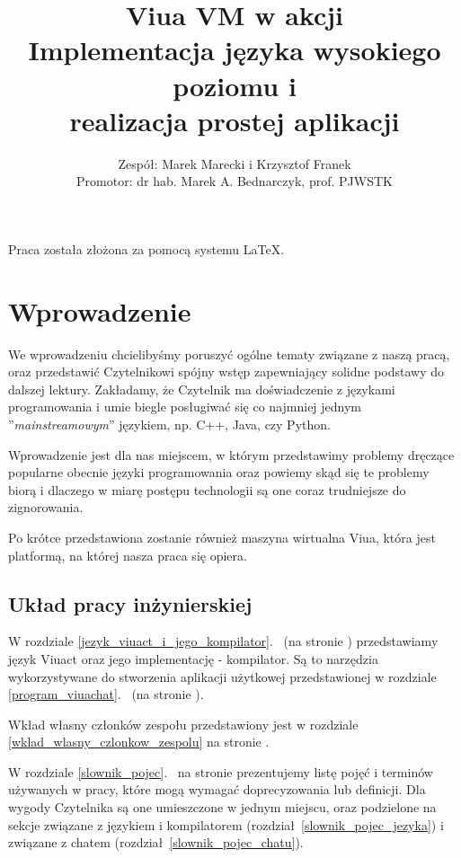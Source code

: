 \documentclass[11pt,oneside,a4paper,titlepage,onecolumn]{book}
\author{Zespół: Marek Marecki i Krzysztof Franek\\Promotor: dr hab. Marek A. Bednarczyk, prof. PJWSTK}
\title{%
    Viua VM w akcji \\
    \large
    Implementacja języka wysokiego poziomu i \\
    realizacja prostej aplikacji}
\begin{document}

\maketitle

\tableofcontents
\listoffigures

Praca została złożona za pomocą systemu \LaTeX.

\newpage

\chapter{Wprowadzenie}

We wprowadzeniu chcielibyśmy poruszyć ogólne tematy związane z naszą pracą, oraz przedstawić Czytelnikowi
spójny wstęp zapewniający solidne podstawy do dalszej lektury. Zakładamy, że Czytelnik ma doświadczenie z
językami programowania i umie biegle posługiwać się co najmniej jednym ''\emph{mainstreamowym}'' językiem, np.
C++, Java, czy Python.

Wprowadzenie jest dla nas miejscem, w którym przedstawimy problemy dręczące popularne obecnie języki
programowania oraz powiemy skąd się te problemy biorą i dlaczego w miarę postępu technologii są one coraz
trudniejsze do zignorowania.

Po krótce przedstawiona zostanie również maszyna wirtualna Viua, która jest platformą, na której nasza praca
się opiera.

\section{Układ pracy inżynierskiej}

W rozdziale \ref{jezyk_viuact_i_jego_kompilator}.~ (na stronie
\pageref{jezyk_viuact_i_jego_kompilator}) przedstawiamy język Viuact oraz jego implementację - kompilator.
Są to narzędzia wykorzystywane do stworzenia aplikacji użytkowej przedstawionej w rozdziale
\ref{program_viuachat}.~ (na stronie \pageref{program_viuachat}).

Wkład własny członków zespołu przedstawiony jest w rozdziale \ref{wklad_wlasny_czlonkow_zespolu} na stronie
\pageref{wklad_wlasny_czlonkow_zespolu}.

W rozdziale \ref{slownik_pojec}.~ na stronie \pageref{slownik_pojec} prezentujemy listę
pojęć i terminów używanych w pracy, które mogą wymagać doprecyzowania lub definicji. Dla wygody Czytelnika są
one umieszczone w jednym miejscu, oraz podzielone na sekcje związane z językiem i kompilatorem
(rozdział~\ref{slownik_pojec_jezyka}) i związane z chatem (rozdział~\ref{slownik_pojec_chatu}).
\end{document}
